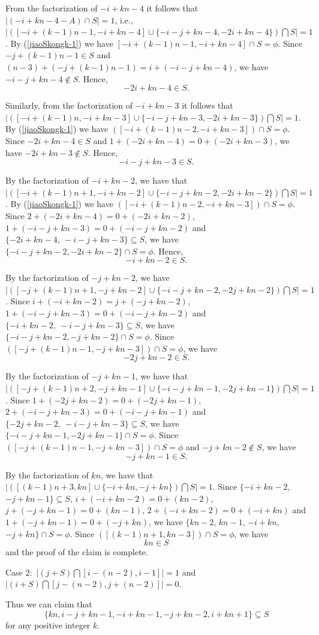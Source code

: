 \documentclass[preprint]{elsarticle}
\begin{document}
From the factorization of $-i+kn-4$ it follows that $|(-i+kn-4-A)\cap S|=1$, i.e.,
$|([-i+(k-1)n-1,-i+kn-4]\cup \{-i-j+kn-4,-2i+kn-4\})\bigcap S|=1$.
By (\ref{jiaoSkongk-1}) we have $[-i+(k-1)n-1,-i+kn-4]\cap S=\phi$.
Since $-j+(k-1)n-1\in S$ and $(n-3)+(-j+(k-1)n-1)=i+(-i-j+kn-4)$, we have $-i-j+kn-4\not\in S$.
Hence, $$-2i+kn-4\in S.$$

Similarly, from the factorization of $-i+kn-3$ it follows that $|([-i+(k-1)n,-i+kn-3]\cup \{-i-j+kn-3,-2i+kn-3\})\bigcap S|=1$.
By (\ref{jiaoSkongk-1}) we have $([-i+(k-1)n-2,-i+kn-3])\cap S=\phi$.
Since $-2i+kn-4\in S$ and $1+(-2i+kn-4)=0+(-2i+kn-3)$, we have $-2i+kn-3\not\in S$.
Hence, $$-i-j+kn-3\in S.$$

By the factorization of $-i+kn-2$,
we have that $|([-i+(k-1)n+1,-i+kn-2]\cup \{-i-j+kn-2,-2i+kn-2\})\bigcap S|=1$.
By (\ref{jiaoSkongk-1}) we have $([-i+(k-1)n-2,-i+kn-3])\cap S=\phi$.
Since $2+(-2i+kn-4)=0+(-2i+kn-2)$, $1+(-i-j+kn-3)=0+(-i-j+kn-2)$ and $\{-2i+kn-4,\ -i-j+kn-3\}\subseteq S$,
we have $\{-i-j+kn-2,-2i+kn-2\}\cap S=\phi$.
Hence, $$-i+kn-2\in S.$$

By the factorization of $-j+kn-2$,
we have $|([-j+(k-1)n+1,-j+kn-2]\cup \{-i-j+kn-2,-2j+kn-2\})\bigcap S|=1$.
Since $i+(-i+kn-2)=j+(-j+kn-2)$, $1+(-i-j+kn-3)=0+(-i-j+kn-2)$ and $\{-i+kn-2,\ -i-j+kn-3\}\subseteq S$,
we have $\{-i-j+kn-2,-j+kn-2\}\cap S=\phi$.
Since $([-j+(k-1)n-1,-j+kn-3])\cap S=\phi$,
we have $$-2j+kn-2\in S.$$

By the factorization of $-j+kn-1$,
we have that $|([-j+(k-1)n+2,-j+kn-1]\cup \{-i-j+kn-1,-2j+kn-1\})\bigcap S|=1$.
Since $1+(-2j+kn-2)=0+(-2j+kn-1)$, $2+(-i-j+kn-3)=0+(-i-j+kn-1)$ and $\{-2j+kn-2,\ -i-j+kn-3\}\subseteq S$,
we have $\{-i-j+kn-1,-2j+kn-1\}\cap S=\phi$.
Since $([-j+(k-1)n-1,-j+kn-3])\cap S=\phi$ and $-j+kn-2\not\in S$,
we have $$-j+kn-1\in S.$$

By the factorization of $kn$,
we have that $|([(k-1)n+3,kn]\cup \{-i+kn,-j+kn\})\bigcap S|=1$.
Since $\{-i+kn-2,$ $-j+kn-1\}\subseteq S$, $i+(-i+kn-2)=0+(kn-2),$ $j+(-j+kn-1)=0+(kn-1)$, $2+(-i+kn-2)=0+(-i+kn)$
and $1+(-j+kn-1)=0+(-j+kn)$,
we have $\{kn-2$, $kn-1$, $-i+kn$, $-j+kn\}\cap S=\phi$.
Since $([(k-1)n+1,kn-3])\cap S=\phi$,
we have $$kn\in S$$ and the proof of the claim is complete.

Case $2:$ $|(j+S)\bigcap [i-(n-2),i-1]|=1$ and $|(i+S)\bigcap [j-(n-2),j+(n-2)]|=0$.

Thus we can claim that $$\{kn,i-j+kn-1,-i+kn-1,-j+kn-2,i+kn+1\}\subseteq S$$ for any positive integer $k$.
\end{document}
